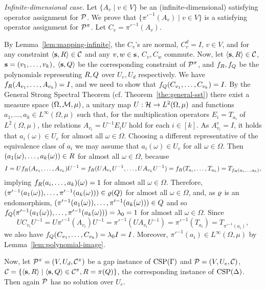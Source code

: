 {\it Infinite-dimensional case.}
Let $\{A_v\mid v\in V\}$ be an (infinite-dimensional) satisfying operator assignment for ${\mathcal P}$. We prove that $\{\pi'^{-1}(A_v)\mid v\in V\}$ is a satisfying operator assignment for ${\mathcal P}^\pi$. Let $C_v=\pi'^{-1}(A_v)$.

By Lemma~\ref{lem:mapping-infinite}, the $C_v$'s are normal, $C_v^d=I$, $v\in V$,
and for any constraint $\langle {\bf s},R \rangle\in{\mathcal C}$ and any $v,w\in{\bf s}$, $C_v,C_w$ commute.
Now, let $\langle {\bf s},R \rangle\in{\mathcal C}$, ${\bf s}=(v _1,\ldots, v _{k})$, $\langle {\bf s},Q \rangle$ be the
corresponding constraint of ${\mathcal P}^\pi$, and $f_R,f_Q$ be the polynomials representing $R,Q$ over $U_e,U_d$ respectively. We have $f_R(A_{v_1},\ldots, A_{v_k})=I$, and we need to show that $f_Q(C_{v_1},\ldots, C_{v_k})=I$. By the General Strong Spectral Theorem (cf. Theorem~\ref{the:general-sst}) there exist a measure space $(\Omega,{\mathcal M},\mu)$, a unitary map $U:{\mathcal H}\to L^2(\Omega,\mu)$ and functions $a_1,\dots,a_k\in L^\infty(\Omega,\mu)$ such that, for the multiplication operators $E_i = T_{a_i}$ of $L^2(\Omega,\mu)$, the relations $A_{v_i} = U^{-1} E_iU$ hold for each $i\in [k]$. As $A_{v_i}^e=I$, it holds that $a_i(\omega)\in U_e$ for almost all $\omega\in\Omega$. Choosing a different representative of the equivalence class of $a_i$ we may assume that $a_i(\omega)\in U_e$ for all $\omega\in\Omega$. Then $(a_1(\omega),\ldots, a_k(\omega))\in R$ for almost all $\omega\in\Omega$, because
\[
I=Uf_R(A_{v_1},\ldots, A_{v_k})U^{-1}=f_R(UA_{v_1}U^{-1},\ldots, UA_{v_k}U^{-1})= f_R(T_{a_i},\ldots, T_{a_k})=T_{f_R(a_i,\ldots, a_k)},
\]
implying $f_R(a_i,\ldots, a_k)(\omega)=1$ for almost all $\omega\in\Omega$. Therefore, $(\pi'^{-1}(a_1(\omega)),\ldots, \pi'^{-1}(a_k(\omega)))\in\varrho(Q)$ for almost all $\omega\in\Omega$, and, as $\varrho$ is an endomorphism, $(\pi'^{-1}(a_1(\omega)),\ldots, \pi'^{-1}(a_k(\omega)))\in Q$ and so $f_Q(\pi'^{-1}(a_1(\omega)),\ldots, \pi'^{-1}(a_k(\omega)))=\lambda_0=1$ for almost all $\omega\in\Omega$. Since 
\[
UC_{v_i}U^{-1}=U\pi'^{-1}(A_{v_i})U^{-1}=\pi'^{-1}(UA_{v_i}U^{-1})=\pi'^{-1}(T_{a_i})=T_{\pi'^{-1}(a_i)},
\]
we also have $f_Q(C_{v_1},\ldots, C_{v_k})=\lambda_0I=I$. Moreover, $\pi'^{-1}(a_i)\in L^\infty(\Omega,\mu)$ by Lemma~\ref{lem:polynomial-image}.

\smallskip

Now, let ${\mathcal P}^\pi=(V,U_d,{\mathcal C}^\pi)$ be a gap instance of ${\rm CSP}(\Gamma)$ and ${\mathcal P}=(V,U_e,{\mathcal C})$, ${\mathcal C}=\{\langle {\bf s},R \rangle\mid\langle {\bf s},Q \rangle\in{\mathcal C}^\pi,R=\pi(Q)\}$, the corresponding instance of ${\rm CSP}(\Delta)$. Then again ${\mathcal P}$ has no solution over $U_e$.

